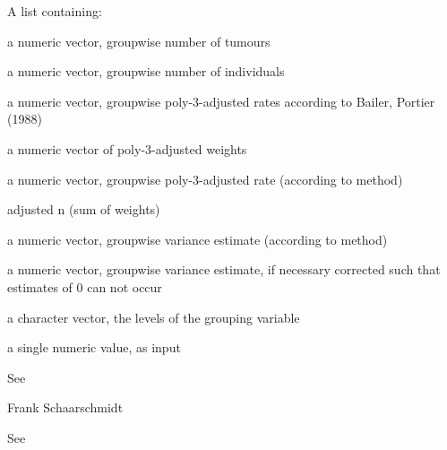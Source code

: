 \begin{Value}
A list containing:
\begin{ldescription}
\item[\code{Y }] a numeric vector, groupwise number of tumours
\item[\code{n}] a numeric vector, groupwise number of individuals
\item[\code{estimate}] a numeric vector, groupwise poly-3-adjusted rates according to Bailer, Portier (1988)
\item[\code{weight}] a numeric vector of poly-3-adjusted weights 
\item[\code{estp}] a numeric vector, groupwise poly-3-adjusted rate (according to method)
\item[\code{nadj}] adjusted n (sum of weights)
\item[\code{varp}] a numeric vector, groupwise variance estimate (according to method)
\item[\code{varcor}] a numeric vector, groupwise variance estimate, if necessary corrected such that estimates of 0 can not occur
\item[\code{names}] a character vector, the levels of the grouping variable  
\item[\code{k}] a single numeric value, as input
\end{ldescription}
\end{Value}
\begin{Note}\relax
See 
\end{Note}
\begin{Author}\relax
Frank Schaarschmidt
\end{Author}
\begin{References}\relax
See 
\end{References}
\begin{Examples}
\begin{ExampleCode}
\end{ExampleCode}
\end{Examples}

